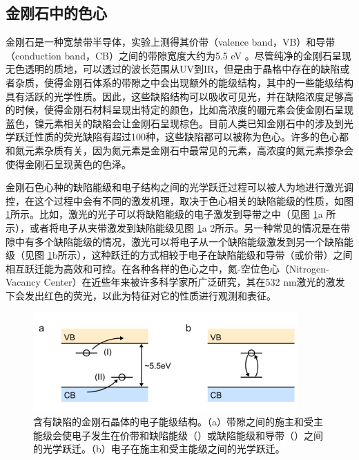\documentclass[type = bachelor]{whu-thesis}
\begin{document}
\subsection{金刚石中的色心}
金刚石是一种宽禁带半导体，实验上测得其价带（valence band，VB）和导带（conduction band，CB）之间的带隙宽度大约为5.5 \unit{\eV} \cite{mildren2013optical,cheng2023bandgap,wort2008diamond}。尽管纯净的金刚石呈现无色透明的质地，可以透过的波长范围从UV到IR，但是由于晶格中存在的缺陷或者杂质，使得金刚石体系的带隙之中会出现额外的能级结构，其中的一些能级结构具有活跃的光学性质。因此，这些缺陷结构可以吸收可见光，并在缺陷浓度足够高的时候，使得金刚石材料呈现出特定的颜色，比如高浓度的硼元素会使金刚石呈现蓝色，镍元素相关的缺陷会让金刚石呈现棕色。目前人类已知金刚石中的涉及到光学跃迁性质的荧光缺陷有超过100种，这些缺陷都可以被称为色心\cite{koizumi2008physics,jelezko2006single}。许多的色心都和氮元素杂质有关，因为氮元素是金刚石中最常见的元素，高浓度的氮元素掺杂会使得金刚石呈现黄色的色泽\cite{breeding2020naturally, zaitsev2016spectroscopic}。

金刚石色心种的缺陷能级和电子结构之间的光学跃迁过程可以被人为地进行激光调控，在这个过程中会有不同的激发机理，取决于色心相关的缺陷能级的性质，如图 \ref{fig: Optical Transition}所示。比如，激光的光子可以将缺陷能级的电子激发到导带之中（见图 \ref{fig: Optical Transition}a \uppercase\expandafter{}所示），或者将电子从夹带激发到缺陷能级见图 \ref{fig: Optical Transition}a \uppercase\expandafter{\romannumeral2所示}。另一种常见的情况是在带隙中有多个缺陷能级的情况，激光可以将电子从一个缺陷能级激发到另一个缺陷能级（见图 \ref{fig: Optical Transition}b所示），这种跃迁的方式相较于电子在缺陷能级和导带（或价带）之间相互跃迁能为高效和可控\cite{gali2011time,gali2012excitation}。在各种各样的色心之中，氮-空位色心（Nitrogen-Vacancy Center）在近些年来被许多科学家所广泛研究，其在532 nm激光的激发下会发出红色的荧光，以此为特征对它的性质进行观测和表征\cite{doherty2013nitrogen}。

\begin{figure}
  \centering
  \includegraphics[width=0.9\textwidth]{figures/Chapter 1/Optical Transition.png}
  \caption[含有缺陷的金刚石晶体的电子能级结构]{含有缺陷的金刚石晶体的电子能级结构。（a）带隙之间的施主和受主能级会使电子发生在价带和缺陷能级（\uppercase\expandafter{}）或缺陷能级和导带（\uppercase\expandafter{}）之间的光学跃迁。（b）电子在施主和受主能级之间的光学跃迁\cite{staudacher2015nuclear}。}
  \label{fig: Optical Transition}
\end{figure}
\end{document}
